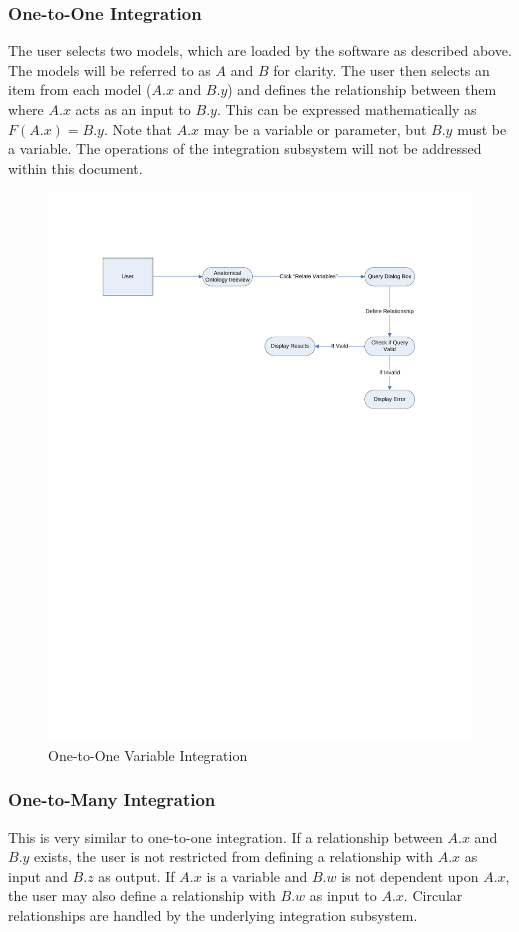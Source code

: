 \documentclass{article}
\begin{document}
\subsubsection{One-to-One Integration}
The user selects two models, which are loaded by the software as described above. The models will be referred to as $A$ and $B$ for clarity. The user then selects an item from each model ($A.x$ and $B.y$) and defines the relationship between them where $A.x$ acts as an input to $B.y$. This can be expressed mathematically as $F(A.x) = B.y$. Note that $A.x$ may be a variable or parameter, but $B.y$ must be a variable. The operations of the integration subsystem will not be addressed within this document.
\begin{figure}[!htb]
\centering
\includegraphics[width=\textwidth]{./diagrams/relate-vars}
\caption{One-to-One Variable Integration}
\end{figure}
\subsubsection{One-to-Many Integration}
This is very similar to one-to-one integration. If a relationship between $A.x$ and $B.y$ exists, the user is not restricted from defining a relationship with $A.x$ as input and $B.z$ as output. If $A.x$ is a variable and $B.w$ is not dependent upon $A.x$, the user may also define a relationship with $B.w$ as input to $A.x$. Circular relationships are handled by the underlying integration subsystem.
\end{document}
